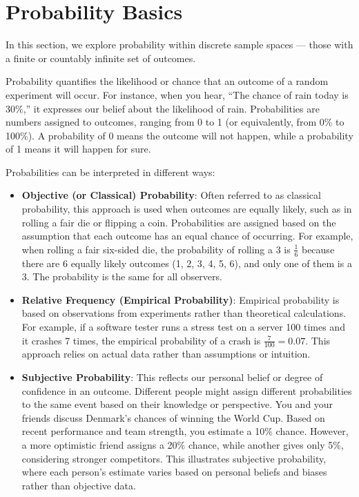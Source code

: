 \section{Probability Basics}
In this section, we explore probability within discrete sample spaces — those with a finite or countably infinite set of outcomes.

Probability quantifies the likelihood or chance that an outcome of a random experiment will occur. For instance, when you hear, “The chance of rain today is 30\%,” it expresses our belief about the likelihood of rain. Probabilities are numbers assigned to outcomes, ranging from 0 to 1 (or equivalently, from 0\% to 100\%). A probability of 0 means the outcome will not happen, while a probability of 1 means it will happen for sure.

Probabilities can be interpreted in different ways:

\begin{itemize}
    \item \textbf{Objective (or Classical) Probability}: Often referred to as classical probability, this approach is used when outcomes are equally likely, such as in rolling a fair die or flipping a coin. Probabilities are assigned based on the assumption that each outcome has an equal chance of occurring. For example, when rolling a fair six-sided die, the probability of rolling a 3 is \( \frac{1}{6} \) because there are 6 equally likely outcomes (1, 2, 3, 4, 5, 6), and only one of them is a 3. The probability is the same for all observers.
        
    \item \textbf{Relative Frequency (Empirical Probability)}: Empirical probability is based on observations from experiments rather than theoretical calculations. For example, if a software tester runs a stress test on a server 100 times and it crashes 7 times, the empirical probability of a crash is \( \frac{7}{100} = 0.07 \). This approach relies on actual data rather than assumptions or intuition.
        
    \item \textbf{Subjective Probability}: This reflects our personal belief or degree of confidence in an outcome. Different people might assign different probabilities to the same event based on their knowledge or perspective. You and your friends discuss Denmark’s chances of winning the World Cup. Based on recent performance and team strength, you estimate a 10\% chance. However, a more optimistic friend assigns a 20\% chance, while another gives only 5\%, considering stronger competitors. This illustrates subjective probability, where each person's estimate varies based on personal beliefs and biases rather than objective data.
    

\end{itemize}

